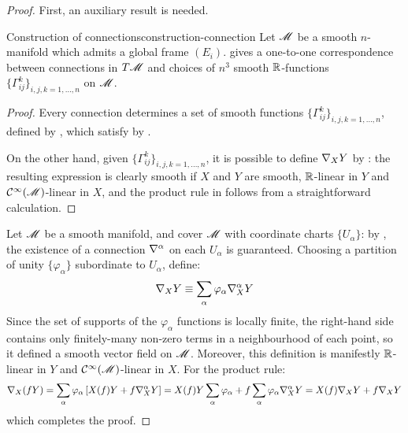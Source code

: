 \begin{proofbox}
  \begin{proof}
    First, an auxiliary result is needed.

    \begin{lemma}{Construction of connections}{construction-connection}
      Let $ \mathscr{M} $ be a smooth $ n $-manifold which admits a global frame $ (E_i) $.  gives a one-to-one correspondence between connections in $ T\mathscr{M} $ and choices of $ n^3 $ smooth $ \mathbb{R} $-functions $ \{\Gamma^k_{ij}\}_{i,j,k = 1 , \dots , n} $ on $ \mathscr{M} $.
    \end{lemma}

    \begin{proofbox}
      \begin{proof}
        Every connection determines a set of smooth functions $ \{\Gamma^k_{ij}\}_{i,j,k = 1 , \dots , n} $, defined by , which satisfy  by .

        On the other hand, given $ \{\Gamma^k_{ij}\}_{i,j,k = 1 , \dots , n} $, it is possible to define $ \nabla_X Y $ by : the resulting expression is clearly smooth if $ X $ and $ Y $ are smooth, $ \mathbb{R} $-linear in $ Y $ and $ \mathcal{C}^{\infty}(\mathscr{M}) $-linear in $ X $, and the product rule in  follows from a straightforward calculation.
      \end{proof}
    \end{proofbox}

    Let $ \mathscr{M} $ be a smooth manifold, and cover $ \mathscr{M} $ with coordinate charts $ \{U_\alpha\} $: by , the existence of a connection $ \nabla^\alpha $ on each $ U_\alpha $ is guaranteed. Choosing a partition of unity $ \{\varphi_\alpha\} $ subordinate to $ U_\alpha $, define:
    \begin{equation*}
      \nabla_X Y \equiv \sum_\alpha \varphi_\alpha \nabla^\alpha_X Y
    \end{equation*}
    Since the set of supports of the $ \varphi_\alpha $ functions is locally finite, the right-hand side contains only finitely-many non-zero terms in a neighbourhood of each point, so it defined a smooth vector field on $ \mathscr{M} $. Moreover, this definition is manifestly $ \mathbb{R} $-linear in $ Y $ and $ \mathcal{C}^{\infty}(\mathscr{M}) $-linear in $ X $. For the product rule:
    \begin{equation*}
      \nabla_X (f Y) = \sum_\alpha \varphi_\alpha \left[ X(f) Y + f \nabla^\alpha_X Y \right] = X(f) Y \sum_\alpha \varphi_\alpha + f \sum_\alpha \varphi_\alpha \nabla^\alpha_X Y = X(f) \nabla_X Y + f \nabla_X Y
    \end{equation*}
    which completes the proof.
  \end{proof}
\end{proofbox}

